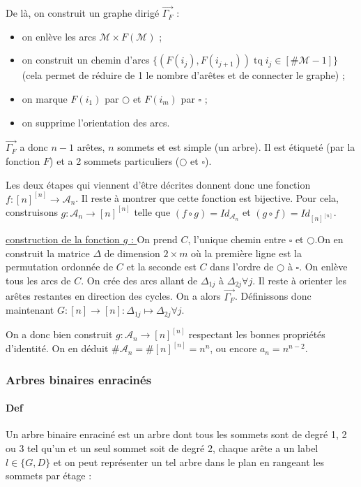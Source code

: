 \documentclass{article}
\DeclareMathOperator{\tq}{\text{ tq }}
\begin{document}
			De là, on construit un graphe dirigé $\vec {\Gamma_F}$ :

				\begin{itemize}
					\item on enlève les arcs $\mathcal M \times F(\mathcal M)$ ;
					\item on construit un chemin d'arcs $\{(F(i_j), F(i_{j+1})) \tq i_j \in [\#\mathcal M - 1]\}$ (cela permet de réduire de 1 le nombre
						  d'arêtes et de connecter le graphe) ;
					\item on marque $F(i_1)$ par $\bigcirc$ et $F(i_m)$ par $\square$ ;
						\item on supprime l'orientation des arcs.
				\end{itemize}

			$\vec {\Gamma_F}$ a donc $n-1$ arêtes, $n$ sommets et est simple (un arbre). Il est étiqueté (par la fonction $F$) et a 2 sommets particuliers
			($\bigcirc$ et $\square$).

			Les deux étapes qui viennent d'être décrites donnent donc une fonction $f : [n]^{[n]} \to \mathcal A_n$. Il reste à montrer que cette fonction est bijective.
			Pour cela, construisons $g : \mathcal A_n \to [n]^{[n]}$ telle que $(f \circ g) = Id_{\mathcal A_n}$ et $(g \circ f) = Id_{[n]^{[n]}}$.

			\underline{construction de la fonction $g$ : } On prend $C$, l'unique chemin entre $\square$ et $\bigcirc$.On en construit la matrice $\Delta$ de dimension
			$2 \times m$ où la première ligne est la permutation ordonnée de $C$ et la seconde est $C$ dans l'ordre de $\bigcirc$ à $\square$. On enlève tous les arcs de $C$.
			On crée des arcs allant de $\Delta_{1j}$ à $\Delta_{2j} \forall j$. Il reste à orienter les arêtes restantes en direction des cycles. On a alors $\vec {\Gamma_F}$.
			Définissons donc maintenant $G : [n] \to [n] : \Delta_{1j} \mapsto \Delta_{2j} \forall j$.

			On a donc bien construit $g : \mathcal A_n \to [n]^{[n]}$ respectant les bonnes propriétés d'identité. On en déduit $\#\mathcal A_n = \#[n]^{[n]} = n^n$,
			ou encore $a_n = n^{n-2}$.

			\subsubsection{Arbres binaires enracinés} %

			\paragraph{Def} Un arbre binaire enraciné est un arbre dont tous les sommets sont de degré 1, 2 ou 3 tel qu'un et un seul sommet soit de degré 2, chaque arête a un
			label $l \in \{G, D\}$ et on peut représenter un tel arbre dans le plan en rangeant les sommets par étage :
\end{document}
